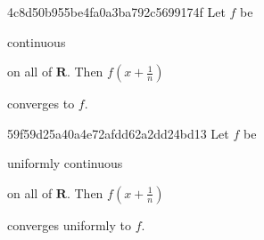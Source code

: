 \begin{note}{4c8d50b955be4fa0a3ba792c5699174f}
    Let \({ f }\) be \begin{icloze}{2}continuous\end{icloze} on all of \({ \mathbf{R} }\).
    Then \({ f(x + \frac{1}{n}) }\) \begin{icloze}{1}converges to \({ f }\).\end{icloze}
\end{note}

\begin{note}{59f59d25a40a4e72afdd62a2dd24bd13}
    Let \({ f }\) be \begin{icloze}{2}uniformly continuous\end{icloze} on all of \({ \mathbf{R} }\).
    Then \({ f(x + \frac{1}{n}) }\) \begin{icloze}{1}converges uniformly to \({ f }\).\end{icloze}
\end{note}


